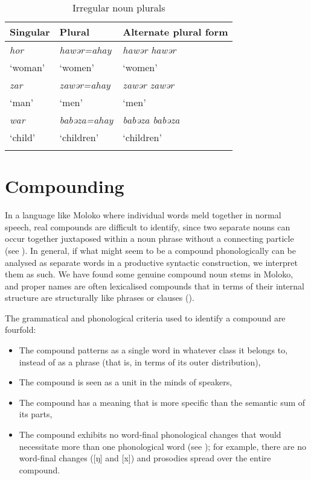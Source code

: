 \begin{table}
\begin{tabular}{lll}
\lsptoprule
{Singular} & {Plural} & {Alternate plural form}\\
\midrule
\textit{hor} & \textit{hawər=ahay} & \textit{hawər hawər} \\
 ‘woman’ & ‘women’  & ‘women’\\\midrule
\textit{zar}  & \textit{zawər=ahay} & \textit{zawər zawər} \\
‘man’ &  ‘men’  & ‘men’\\\midrule
\textit{war} & \textit{babəza=ahay} & \textit{babəza babəza} \\
 ‘child’ & ‘children’  & ‘children’\\
\lspbottomrule
\end{tabular}
\caption{Irregular noun plurals}\label{tab:31}
\end{table}
\section{Compounding}\label{sec:4.3}
\hypertarget{RefHeading1211521525720847}{}
In a language like Moloko where individual words meld together in normal speech, real compounds are difficult to identify, since two separate nouns can occur together juxtaposed within a noun phrase without a connecting particle (see ). In general, if what might seem to be a compound phonologically can be analysed as separate words in a productive syntactic construction, we interpret them as such. We have found some genuine compound noun stems in Moloko, and proper names are often lexicalised compounds that in terms of their internal structure are structurally like phrases or clauses (). 

The grammatical and phonological criteria used to identify a compound are fourfold:
\largerpage
\begin{itemize}
\item The compound patterns as a single word in whatever class it belongs to, instead of as a phrase (that is, in terms of its outer distribution),
\item    The compound is seen as a unit in the minds of speakers,
\item The compound has a meaning that is more specific than the semantic sum of its parts,
\item The compound exhibits no word-final phonological changes that would necessitate more than one phonological word (see ); for example, there are no word-final changes ([ŋ] and [x]) and prosodies spread over the entire compound.
\end{itemize}


